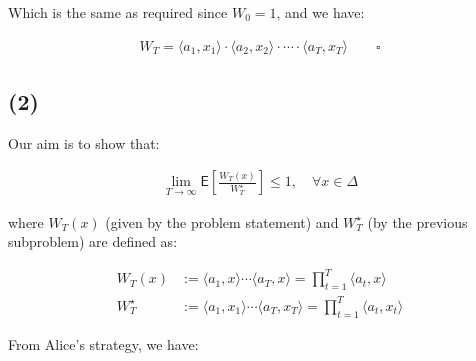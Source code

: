\documentclass{article}
\begin{document}
Which is the same as required since $W_0 = 1$, and we have:

\begin{align*}
    W_T = \langle a_1, x_1 \rangle \cdot \langle a_2, x_2 \rangle \cdot \cdots \cdot \langle a_T, x_T \rangle \qquad \square
\end{align*}

\subsection*{(2)}

Our aim is to show that:

\begin{align*}
    \lim_{T \to \infty} \mathsf{E} \left[ \frac{W_T (x)}{W_T^\star} \right] \leq 1 ,  \quad \forall x \in \Delta \tag{*}
\end{align*}

where $W_T (x)$ (given by the problem statement) and $W_T^\star$ (by the previous subproblem) are defined as:

\begin{align*}
    W_T (x) &:= \langle a_1, x \rangle \cdots \langle a_T, x \rangle = \prod_{t = 1}^T \langle a_t, x \rangle \\
    W_T^\star &:= \langle a_1, x_1 \rangle \cdots \langle a_T, x_T \rangle = \prod_{t = 1}^T \langle a_t, x_t \rangle
\end{align*}

From Alice's strategy, we have:
\end{document}
